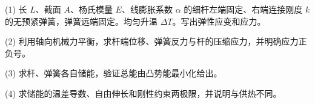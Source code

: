 (1) 长 \(L\)、截面 \(A\)、杨氏模量 \(E\)、线膨胀系数 \(\alpha\) 的细杆左端固定、右端连接刚度 \(k\) 的无预紧弹簧，弹簧远端固定。均匀升温 \(\Delta T\)。写出弹性应变和应力。

(2) 利用轴向机械力平衡，求杆端位移、弹簧反力与杆的压缩应力，并明确应力正负号。

(3) 求杆、弹簧各自储能，验证总能由凸势能最小化给出。

(4) 求储能的温差导数、自由伸长和刚性约束两极限，并说明与供热不同。
